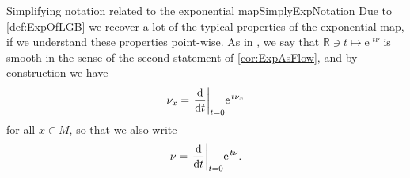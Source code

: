 \documentclass[reqno,a4paper,oneside]{amsart}
\newcommand{\e}{\ensuremath{\mathrm{e\;\!}}}
\theoremstyle{plain}
\theoremstyle{remark}
\theoremstyle{definition}
\begin{document}
\begin{remarks}{Simplifying notation related to the exponential map}{SimplyExpNotation}
Due to \ref{def:ExpOfLGB} we recover a lot of the typical properties of the exponential map, if we understand these properties point-wise. 
As in \cite[\S 3.6, discussion after Prop.\ 3.6.1, page 133]{mackenzieGeneralTheory}, we say that $\mathbb{R} \ni t \mapsto \e^{t\nu}$ is smooth in the sense of the second statement of \ref{cor:ExpAsFlow}, and by construction we have
\begin{equation*}
\nu_x
=
\mleft.\frac{\mathrm{d}}{\mathrm{d}t}\mright|_{t=0} \e^{t\nu_x}
\end{equation*}
for all $x\in M$, so that we also write
\begin{equation*}
\nu
=
\mleft.\frac{\mathrm{d}}{\mathrm{d}t}\mright|_{t=0} \e^{t\nu}.
\end{equation*}
\end{remarks}

\end{document}
